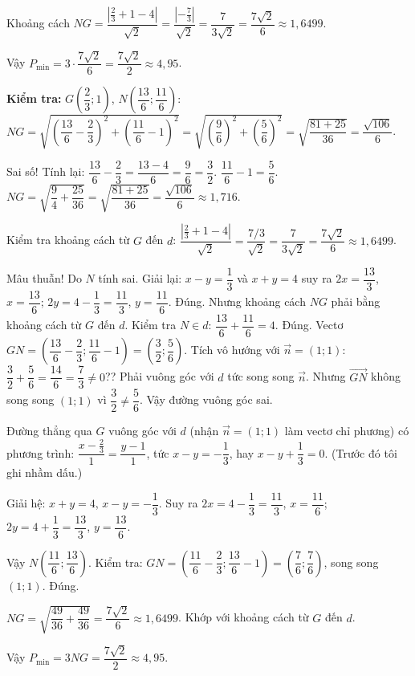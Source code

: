 \begin{bt}
{Khoảng cách $NG=\dfrac{\left|\frac23+1-4\right|}{\sqrt{2}}=\dfrac{\left|-\frac73\right|}{\sqrt{2}}=\dfrac{7}{3\sqrt{2}}=\dfrac{7\sqrt{2}}{6}\approx1{,}6499$.

Vậy $P_{\min}=3\cdot\dfrac{7\sqrt2}{6}=\dfrac{7\sqrt2}{2}\approx4{,}95$.

\textbf{Kiểm tra:} $G\left(\dfrac23;1\right)$, $N\left(\dfrac{13}{6};\dfrac{11}{6}\right)$: $NG=\sqrt{\left(\dfrac{13}{6}-\dfrac23\right)^2+\left(\dfrac{11}{6}-1\right)^2}=\sqrt{\left(\dfrac{9}{6}\right)^2+\left(\dfrac56\right)^2}=\sqrt{\dfrac{81+25}{36}}=\dfrac{\sqrt{106}}{6}$.

Sai số! Tính lại: $\dfrac{13}{6}-\dfrac{2}{3}=\dfrac{13-4}{6}=\dfrac{9}{6}=\dfrac32$. $\dfrac{11}{6}-1=\dfrac56$. $NG=\sqrt{\dfrac94+\dfrac{25}{36}}=\sqrt{\dfrac{81+25}{36}}=\dfrac{\sqrt{106}}{6}\approx1{,}716$.

Kiểm tra khoảng cách từ $G$ đến $d$: $\dfrac{\left|\frac23+1-4\right|}{\sqrt2}=\dfrac{7/3}{\sqrt2}=\dfrac{7}{3\sqrt2}=\dfrac{7\sqrt2}{6}\approx1{,}6499$. 

Mâu thuẫn! Do $N$ tính sai. Giải lại: $x-y=\dfrac13$ và $x+y=4$ suy ra $2x=\dfrac{13}{3}$, $x=\dfrac{13}{6}$; $2y=4-\dfrac13=\dfrac{11}{3}$, $y=\dfrac{11}{6}$. Đúng. Nhưng khoảng cách $NG$ phải bằng khoảng cách từ $G$ đến $d$. Kiểm tra $N\in d$: $\dfrac{13}{6}+\dfrac{11}{6}=4$. Đúng. Vectơ $GN=\left(\dfrac{13}{6}-\dfrac23;\dfrac{11}{6}-1\right)=\left(\dfrac32;\dfrac56\right)$. Tích vô hướng với $\overrightarrow{n}=(1;1)$: $\dfrac32+\dfrac56=\dfrac{14}{6}=\dfrac73\neq0$?? Phải vuông góc với $d$ tức song song $\overrightarrow n$. Nhưng $\overrightarrow{GN}$ không song song $(1;1)$ vì $\dfrac32\neq\dfrac56$. Vậy đường vuông góc sai.

Đường thẳng qua $G$ vuông góc với $d$ (nhận $\overrightarrow{n}=(1;1)$ làm vectơ chỉ phương) có phương trình: $\dfrac{x-\frac23}{1}=\dfrac{y-1}{1}$, tức $x-y=-\dfrac13$, hay $x-y+\dfrac13=0$. (Trước đó tôi ghi nhầm dấu.)

Giải hệ: $x+y=4$, $x-y=-\dfrac13$. Suy ra $2x=4-\dfrac13=\dfrac{11}{3}$, $x=\dfrac{11}{6}$; $2y=4+\dfrac13=\dfrac{13}{3}$, $y=\dfrac{13}{6}$.

Vậy $N\left(\dfrac{11}{6};\dfrac{13}{6}\right)$. Kiểm tra: $GN=\left(\dfrac{11}{6}-\dfrac23;\dfrac{13}{6}-1\right)=\left(\dfrac76;\dfrac76\right)$, song song $(1;1)$. Đúng.

$NG=\sqrt{\dfrac{49}{36}+\dfrac{49}{36}}=\dfrac{7\sqrt2}{6}\approx1{,}6499$. Khớp với khoảng cách từ $G$ đến $d$.

Vậy $P_{\min}=3NG=\dfrac{7\sqrt2}{2}\approx4{,}95$.
}

\end{bt}
